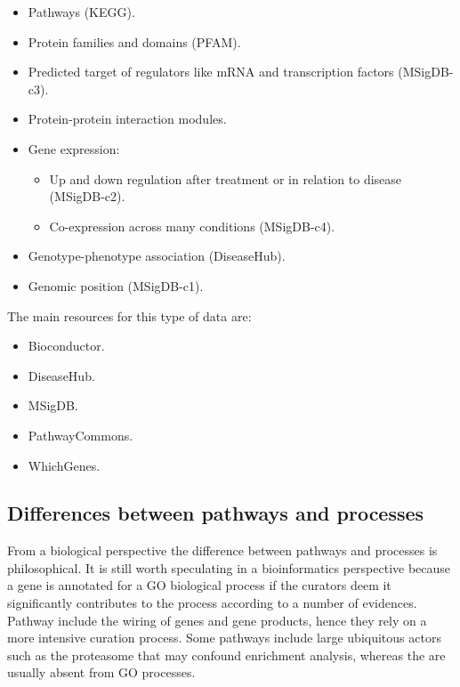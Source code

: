 		\begin{itemize}
			\item Pathways (KEGG).
			\item Protein families and domains (PFAM).
			\item Predicted target of regulators like mRNA and transcription factors (MSigDB-c3).
			\item Protein-protein interaction modules.
			\item Gene expression:

				\begin{itemize}
					\item Up and down regulation after treatment or in relation to disease (MSigDB-c2).
					\item Co-expression across many conditions (MSigDB-c4).
				\end{itemize}

			\item Genotype-phenotype association (DiseaseHub).
			\item Genomic position (MSigDB-c1).
		\end{itemize}

		The main resources for this type of data are:
	
			\begin{itemize}
				\item Bioconductor.
				\item DiseaseHub.
				\item MSigDB.
				\item PathwayCommons.
				\item WhichGenes.
			\end{itemize}
		

	\subsection{Differences between pathways and processes}
	From a biological perspective the difference between pathways and processes is philosophical.
	It is still worth speculating in a bioinformatics perspective because a gene is annotated for a GO biological process if the curators deem it significantly contributes to the process according to a number of evidences.
	Pathway include the wiring of genes and gene products, hence they rely on a more intensive curation process.
	Some pathways include large ubiquitous actors such as the proteasome that may confound enrichment analysis, whereas the are usually absent from GO processes.
	
	
